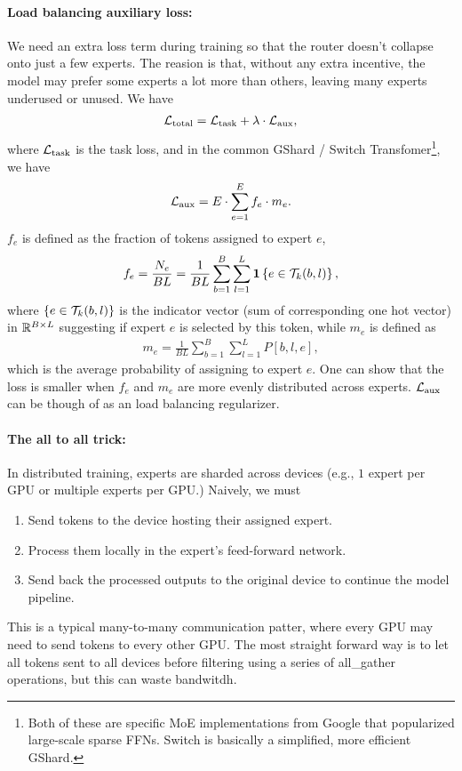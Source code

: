 \documentclass[11pt]{article}  %
\begin{document}
\paragraph{Load balancing auxiliary loss:} 
We need an extra loss term during training so that the router doesn't collapse onto just a few experts. 
The reasion is that, without any extra incentive, the model may prefer some experts a lot more than others, leaving many experts underused or unused.
We have 
\begin{align*}
  \mathcal{L}_{\text{total}} = \mathcal{L}_{\text{task}} + \lambda \cdot \mathcal{L}_{\text{aux}},
\end{align*}
where $\mathcal{L}_{\text{task}}$ is the task loss, and in the common GShard / Switch Transfomer\footnote{Both of these are specific MoE implementations from Google that popularized large-scale sparse FFNs. Switch is basically a simplified, more efficient GShard.}, we have 
\begin{align*}
  \mathcal{L}_{\text{aux}} = E \cdot \sum_{e=1}^{E} f_e \cdot m_e.
\end{align*}
$f_e$ is defined as the fraction of tokens assigned to expert $e$,
\begin{align*}
  f_e = \frac{N_e}{BL} = \frac{1}{BL}\sum_{b=1}^{B}\sum_{l=1}^{L}\mathbf{1}\left\{ e \in \mathcal{T}_k(b, l) \right\},
\end{align*}
where $\left\{ e \in \mathcal{T}_k(b, l) \right\}$ is the indicator vector (sum of corresponding one hot vector) in $\mathbb{R}^{B \times L}$ suggesting if expert $e$ is selected by this token, while $m_e$ is defined as 
\begin{align*}
  m_e = \frac{1}{BL} \sum_{b=1}^{B} \sum_{l=1}^{L} P[b, l, e],
\end{align*}
which is the average probability of assigning to expert $e$.
One can show that the loss is smaller when $f_e$ and $m_e$ are more evenly distributed across experts. 
$\mathcal{L}_{\text{aux}}$ can be though of as an load balancing regularizer.

\paragraph{The all to all trick:}
In distributed training, experts are sharded across devices (e.g., $1$ expert per GPU or multiple experts per GPU.)
Naively, we must 
\begin{enumerate}
  \item Send tokens to the device hosting their assigned expert.
  \item Process them locally in the expert's feed-forward network.
  \item Send back the processed outputs to the original device to continue the model pipeline.
\end{enumerate}
This is a typical many-to-many communication patter, where  every GPU may need to send tokens to every other GPU.
The most straight forward way is to let all tokens sent to all devices before filtering using a series of all\_gather operations, but this can waste bandwitdh.
\end{document}
